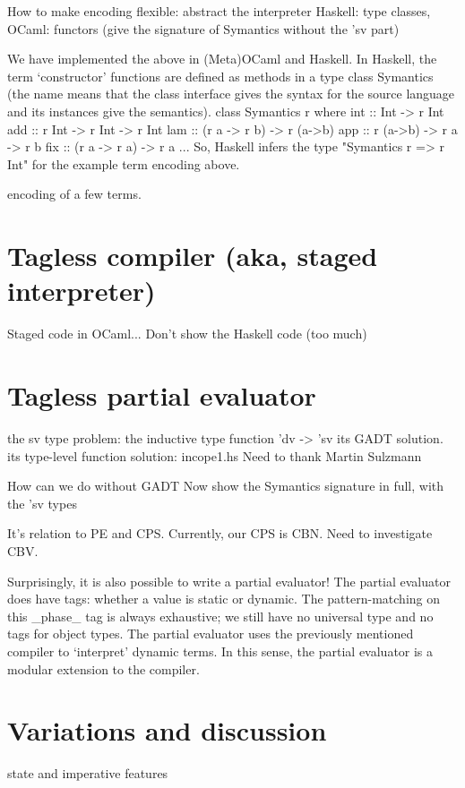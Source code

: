 How to make encoding flexible: abstract the interpreter
Haskell: type classes, OCaml: functors (give the signature of
Symantics without the 'sv part)

We have implemented the above in (Meta)OCaml and Haskell.  In Haskell,
the term `constructor' functions are defined as methods in a type class
Symantics (the name means that the class interface gives the syntax for
the source language and its instances give the semantics).
	class Symantics r where
	  int :: Int -> r Int
	  add :: r Int -> r Int -> r Int
	  lam :: (r a -> r b) -> r (a->b)
	  app :: r (a->b) -> r a -> r b
	  fix :: (r a -> r a) -> r a
	  ...
So, Haskell infers the type "Symantics r => r Int" for the example term
encoding above.


encoding of a few terms.


\section{Tagless compiler (aka, staged interpreter)}
Staged code in OCaml... Don't show the Haskell code (too much)


\section{Tagless partial evaluator}

the sv type problem: the inductive type function 'dv -> 'sv
its GADT solution. 
its type-level function solution: incope1.hs 
  Need to thank Martin Sulzmann

How can we do without GADT
Now show the Symantics signature in full, with the 'sv types

It's relation to PE and CPS. Currently, our CPS is CBN. Need to
investigate CBV.


Surprisingly, it is also possible to write a partial evaluator!  The
partial evaluator does have tags: whether a value is static or dynamic.
The pattern-matching on this _phase_ tag is always exhaustive; we still
have no universal type and no tags for object types.  The partial
evaluator uses the previously mentioned compiler to `interpret' dynamic
terms.  In this sense, the partial evaluator is a modular extension to
the compiler.


\section{Variations and discussion}

state and imperative features

